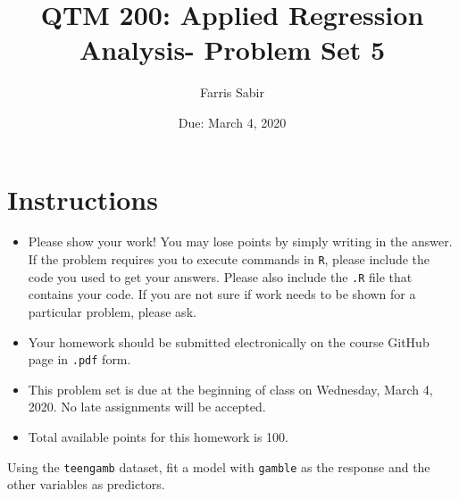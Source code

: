 \documentclass[12pt,letterpaper]{article}
\title{QTM 200: Applied Regression Analysis- Problem Set 5}
\date{Due: March 4, 2020}
\author{Farris Sabir}
\begin{document}
	\maketitle
	
	\section*{Instructions}
	\begin{itemize}
		\item Please show your work! You may lose points by simply writing in the answer. If the problem requires you to execute commands in \texttt{R}, please include the code you used to get your answers. Please also include the \texttt{.R} file that contains your code. If you are not sure if work needs to be shown for a particular problem, please ask.
		\item Your homework should be submitted electronically on the course GitHub page in \texttt{.pdf} form.
		\item This problem set is due at the beginning of class on Wednesday, March 4, 2020. No late assignments will be accepted.
		\item Total available points for this homework is 100.
	\end{itemize}
	
		\vspace{.5cm}
	
\noindent  Using the \texttt{teengamb} dataset, fit a model with \texttt{gamble} as the response and the other variables as predictors. 
\end{document}
